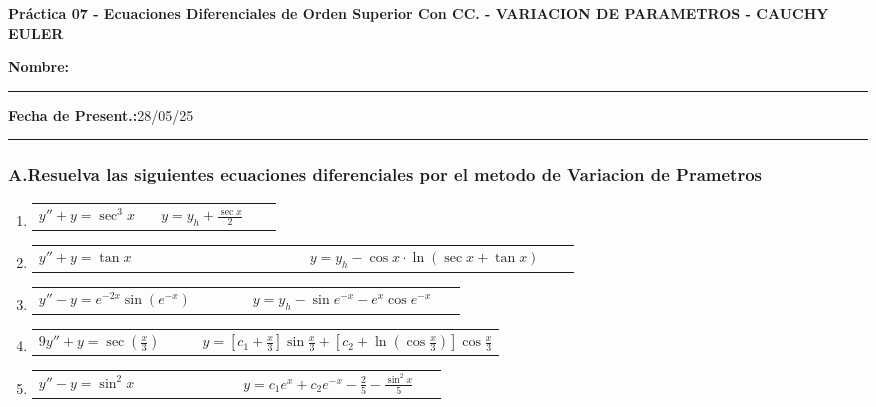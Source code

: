 \documentclass[a4paper,12pt]{article}
\begin{document}
\begin{center}
    \Large\textbf{Práctica 07 - Ecuaciones Diferenciales de Orden Superior Con CC. - VARIACION DE PARAMETROS - CAUCHY EULER}\\[1cm]  

\end{center}
  \textbf{Nombre:} \rule{7.5cm}{0.4pt}  \textbf{Fecha de Present.:}28/05/25  \rule{0.5cm}{0.4pt} 



\subsubsection*{A.Resuelva las siguientes ecuaciones diferenciales por el metodo de Variacion de Prametros}
\begin{enumerate}
    \item
    \begin{tabularx}{\linewidth}{L{0.45\linewidth} R{0.45\linewidth}}
    \( y'' + y = \sec^3 x \) & \(\displaystyle y = y_h + \frac{\sec x}{2} \)
    \end{tabularx}

    \item
    \begin{tabularx}{\linewidth}{L{0.45\linewidth} R{0.45\linewidth}}
    \( y'' + y = \tan x \) & \(\displaystyle y = y_h - \cos x \cdot \ln(\sec x + \tan x) \)
    \end{tabularx}

    \item
    \begin{tabularx}{\linewidth}{L{0.45\linewidth} R{0.45\linewidth}}
    \( y'' - y = e^{-2x} \sin(e^{-x}) \) & \(\displaystyle y = y_h - \sin e^{-x} - e^{x} \cos e^{-x} \)
    \end{tabularx}

    \item
    \begin{tabularx}{\linewidth}{L{0.35\linewidth} R{0.65\linewidth}}
    \( 9 y'' + y = \sec \left( \frac{x}{3} \right) \) & \(\displaystyle y = \left[c_1 + \frac{x}{3}\right] \sin \frac{x}{3} + \left[c_2 + \ln \left(\cos \frac{x}{3}\right)\right] \cos \frac{x}{3} \)
    \end{tabularx}

    \item
    \begin{tabularx}{\linewidth}{L{0.45\linewidth} R{0.45\linewidth}}
    \( y'' - y = \sin^2 x \) & \(\displaystyle y = c_1 e^x + c_2 e^{-x} - \frac{2}{5} - \frac{\sin^2 x}{5} \)
    \end{tabularx}


\end{enumerate}
\end{document}
